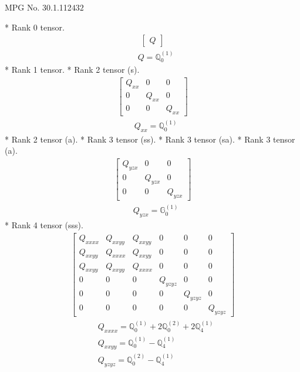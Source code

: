 \documentclass[fleqn,8pt,landscape]{jsarticle}
\begin{document}
\setcounter{MaxMatrixCols}{32}

\renewcommand{\tablename}{Table~}
\renewcommand{\figurename}{Figure~}
\begin{center}
\LARGE
MPG No. 30.1.112\quad$432$
\end{center}
* Rank 0 tensor.
\begin{align*}
\begin{bmatrix} Q \end{bmatrix}
\end{align*}
\begin{align*}
& Q = \mathbb{Q}_{0}^{(1)}
\end{align*}
* Rank 1 tensor.
* Rank 2 tensor (s).
\begin{align*}
\begin{bmatrix} Q_{xx} & 0 & 0 \\ 0 & Q_{xx} & 0 \\ 0 & 0 & Q_{xx} \end{bmatrix}
\end{align*}
\begin{align*}
& Q_{xx} = \mathbb{Q}_{0}^{(1)}
\end{align*}
* Rank 2 tensor (a).
* Rank 3 tensor (ss).
* Rank 3 tensor (sa).
* Rank 3 tensor (a).
\begin{align*}
\begin{bmatrix} Q_{yzx} & 0 & 0 \\ 0 & Q_{yzx} & 0 \\ 0 & 0 & Q_{yzx} \end{bmatrix}
\end{align*}
\begin{align*}
& Q_{yzx} = \mathbb{G}_{0}^{(1)}
\end{align*}
* Rank 4 tensor (sss).
\begin{align*}
\begin{bmatrix} Q_{xxxx} & Q_{xxyy} & Q_{xxyy} & 0 & 0 & 0 \\ Q_{xxyy} & Q_{xxxx} & Q_{xxyy} & 0 & 0 & 0 \\ Q_{xxyy} & Q_{xxyy} & Q_{xxxx} & 0 & 0 & 0 \\ 0 & 0 & 0 & Q_{yzyz} & 0 & 0 \\ 0 & 0 & 0 & 0 & Q_{yzyz} & 0 \\ 0 & 0 & 0 & 0 & 0 & Q_{yzyz} \end{bmatrix}
\end{align*}
\begin{align*}
& Q_{xxxx} = \mathbb{Q}_{0}^{(1)} + 2 \mathbb{Q}_{0}^{(2)} + 2 \mathbb{Q}_{4}^{(1)} \\
& Q_{xxyy} = \mathbb{Q}_{0}^{(1)} - \mathbb{Q}_{4}^{(1)} \\
& Q_{yzyz} = \mathbb{Q}_{0}^{(2)} - \mathbb{Q}_{4}^{(1)}
\end{align*}
\end{document}
